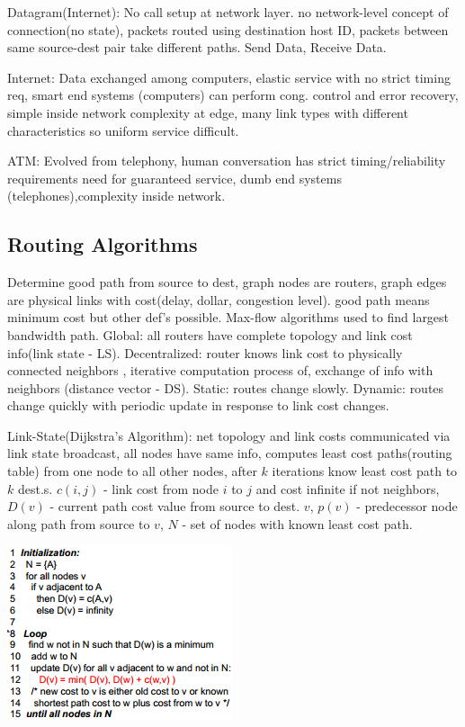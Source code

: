 \documentclass[9pt]{extarticle}
\begin{document}
\begin{multicols}{2}
Datagram(Internet): No call setup at network layer. no network-level concept of connection(no state), packets routed using destination host ID, packets between same source-dest pair take different paths. Send Data, Receive Data.

Internet: Data exchanged among computers, elastic service with no strict timing req, smart end systems (computers) can perform cong. control and error recovery, simple inside network complexity at edge, many link types with different characteristics so uniform service difficult.

ATM: Evolved from telephony, human conversation has strict timing/reliability requirements need for guaranteed service, dumb end systems (telephones),complexity inside network.

\subsection{Routing Algorithms}

Determine good path from source to dest, graph nodes are routers, graph edges are physical links with cost(delay, dollar, congestion level). good path means minimum cost but other def’s possible. Max-flow algorithms used to find largest bandwidth path. Global: all routers have complete topology and link cost info(link state - LS). Decentralized: router knows link cost to physically connected neighbors , iterative computation process of, exchange of info with neighbors (distance vector - DS). Static: routes change slowly. Dynamic: routes change quickly with periodic update in response to link cost changes.

Link-State(Dijkstra's Algorithm): net topology and link costs communicated via link state broadcast, all nodes have same info, computes least cost paths(routing table) from one node to all other nodes, after $k$ iterations know least cost path to $k$ dest.s. $c(i,j)$ - link cost from node $i$ to $j$ and cost infinite if not neighbors, $D(v)$ - current path cost value from source to dest. $v$, $p(v)$ - predecessor node along path from source to $v$, $N$ - set of nodes with known least cost path. 

\includegraphics{dijkstra.png}


\end{multicols}
\end{document}
